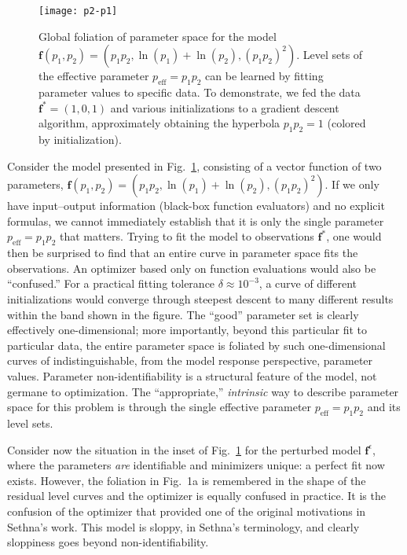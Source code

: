 \begin{figure}
  \centerline{\texttt{[image: p2-p1]}}
  \caption[Illustration of effects of sloppiness on optimization]{Global foliation of parameter space for the model
    $\mathbf{f}(p_1,p_2) = (p_1 p_2 , \ln(p_1) + \ln(p_2) , (p_1 p_2)^2)$.
    Level sets of the effective parameter $p_\mathrm{eff} = p_1 p_2$
    can be learned by fitting parameter values to specific data.
    To demonstrate, we fed the data $\mathbf{f}^*=(1,0,1)$ and various initializations 
    to a gradient descent algorithm, approximately obtaining the hyperbola $p_1 p_2 = 1$ (colored by initialization).
    \label{fig:non-id} }
\end{figure}

Consider the model presented in Fig.~\ref{fig:non-id}, consisting of a
vector function of two parameters,
$\mathbf{f}(p_1,p_2) = (p_1 p_2 , \ln(p_1) + \ln(p_2) , (p_1 p_2)^2)$.
If we only have input--output information (black-box function
evaluators) and no explicit formulas, we cannot immediately establish
that it is only the single parameter $p_\mathrm{eff}=p_1 p_2$ that
matters.  Trying to fit the model to observations $\mathbf{f}^*$, one
would then be surprised to find that an entire curve in parameter
space fits the observations.  An optimizer based only on function
evaluations would also be ``confused.''  For a practical fitting
tolerance $\delta\approx10^{-3}$, a curve of different initializations
would converge through steepest descent to many different results
within the band shown in the figure.  The ``good'' parameter set is
clearly effectively one-dimensional; more importantly, beyond this
particular fit to particular data, the entire parameter space is
foliated by such one-dimensional curves of indistinguishable, from the
model response perspective, parameter values.  Parameter
non-identifiability is a structural feature of the model, not germane
to optimization.  The ``appropriate,'' \emph{intrinsic} way to
describe parameter space for this problem is through the single
effective parameter $p_\mathrm{eff}=p_1 p_2$ and its level sets.

Consider now the situation in the inset of Fig.~\ref{fig:non-id} for
the perturbed model $\mathbf{f}^\epsilon$, where the parameters \emph{are}
identifiable and minimizers unique: a perfect fit now exists.
However, the foliation in Fig.~1a is remembered in the shape of the
residual level curves and the optimizer is equally confused in
practice.  It is the confusion of the optimizer that provided one of
the original motivations in Sethna's work.  This model is sloppy, in
Sethna's terminology, and clearly sloppiness goes beyond
non-identifiability.

